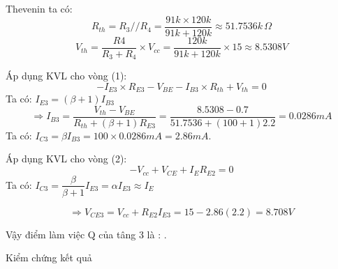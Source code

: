 \begin{itemize}[label=-]
		Thevenin ta có:
		\[ R_{th} = R_{3}//R_{4} = \dfrac{91k \times 120k}{91k + 120k} \approx 51.7536k \,\Omega \]
		\[ V_{th} = \dfrac{R4}{R_{3} + R_{4}}\times V_{cc} = \dfrac{120k}{91k + 120k}\times 15 \approx 8.5308V\]
		
		Áp dụng KVL cho vòng (1):
		\[ -I_{E3}\times R_{E3} - V_{BE} - I_{B3}\times R_{th} + V_{th} = 0 \]
		Ta có: $I_{E3} = (\beta + 1) I_{B3}$
		\[ \Rightarrow I_{B3} = \dfrac{V_{th} - V_{BE}}{R_{th} + (\beta + 1)R_{E3}} = \dfrac{8.5308 - 0.7}{51.7536 + (100+1)2.2} = 0.0286mA\]
		Ta có: $I_{C3} = \beta I_{B3} = 100\times 0.0286mA = 2.86mA$.
		
		Áp dụng KVL cho vòng (2):
		\[-V_{cc} + V_{CE} + I_{E}R_{E2} = 0 \]
		Ta có: $I_{C3} = \dfrac{\beta}{\beta + 1}I_{E3} = \alpha I_{E3} \approx I_{E}$
		
		\[ \Rightarrow V_{CE3} = V_{cc} + R_{E2}I_{E3} = 15 - 2.86(2.2) = 8.708V\]
		
		Vậy điểm làm việc Q của tâng 3 là : .
\end{itemize}

Kiểm chứng kết quả

